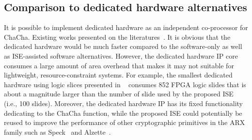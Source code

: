 \subsection{Comparison to dedicated hardware alternatives}
It is possible to implement dedicated hardware as an independent co-processor for ChaCha. 
Existing works presented on the literatures~\cite{KLA:19,PRH:19}.
It is obvious that the dedicated hardware would be much faster compared to the software-only as well as ISE-assisted software alternatives.
However, the dedicated hardware IP core consumes a large amount of area overhead 
that makes it may not suitable for lightweight, resource-constraint systems.
For example, the smallest dedicated hardware using logic slices presented in ~\cite{PRH:19} consumes 852 FPGA logic slides that is about a magnitude larger than the number of slide used by the proposed ISE (i.e., 100 slides).
Moreover, the dedicated hardware IP has its fixed functionality dedicating to the ChaCha function, 
while the proposed ISE could potentially be reused 
to improve the performance of other cryptographic primitives in the ARX family such as Speck~\cite{BSSTWW:13} and Alzette~\cite{BBC:20}.  


